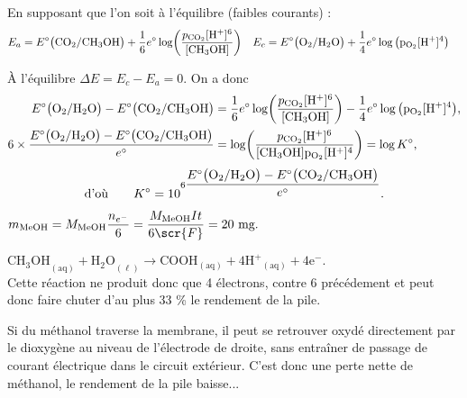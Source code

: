 \begin{solution}
\begin{questions}
\question En supposant que l'on soit à l'équilibre (faibles courants) :
\begin{align*}
    E_a &= E^\circ\qty\big(\mathrm{CO_2 / CH_3OH}) + \dfrac{1}{6}e^\circ \log(\dfrac{p_\mathrm{CO_2} \mathrm{[H^+]^6}}{\mathrm{[CH_3OH]}}) &
    E_c &= E^\circ\qty\big(\mathrm{O_2 / H_2O}) + \dfrac{1}{4}e^\circ \log\qty\big(\mathrm{p_\mathrm{O_2} [H^+]^4})
\end{align*}

\question \`A l'équilibre $\Delta E = E_c - E_a = 0$. On a donc
\begin{align*}
    E^\circ\qty\big(\mathrm{O_2 / H_2O}) - E^\circ\qty\big(\mathrm{CO_2 / CH_3OH})
    &= \dfrac{1}{6}e^\circ \log(\dfrac{p_\mathrm{CO_2} \mathrm{[H^+]^6}}{\mathrm{[CH_3OH]}}) - \dfrac{1}{4}e^\circ \log\qty\big(\mathrm{p_\mathrm{O_2} [H^+]^4}), \\
    6 \times \dfrac{E^\circ\qty\big(\mathrm{O_2 / H_2O}) - E^\circ\qty\big(\mathrm{CO_2 / CH_3OH})}{e^\circ} 
    &= \log(\dfrac{p_\mathrm{CO_2} \mathrm{[H^+]^6}}{\mathrm{[CH_3OH]p_\mathrm{O_2} [H^+]^4}}) = \log K^\circ,
\end{align*}
$$\text{d'o\`u} \qquad K^\circ = 10^{6 \dfrac{E^\circ\qty\big(\mathrm{O_2 / H_2O}) - E^\circ\qty\big(\mathrm{CO_2 / CH_3OH})}{e^\circ}}.$$

\question $m_\mathrm{MeOH} = M_\mathrm{MeOH} \dfrac{n_{e^-}}{6} = \dfrac{M_\mathrm{MeOH} I t}{6\scr{F}} = 20 \text{ mg}.$

\question $\mathrm{{CH_3OH}_{(aq)} + {H_2O}_{(\ell)} \longrightarrow {COOH}_{(aq)} + 4 {H^+}_{(aq)} + 4 e^-}.$ \\
Cette réaction ne produit donc que 4 électrons, contre 6 précédement et peut donc faire chuter d'au plus 33 \% le rendement de la pile.

\question Si du méthanol traverse la membrane, il peut se retrouver oxydé directement par le dioxygène au niveau de l’électrode de droite, sans entraîner de passage de courant électrique dans le circuit extérieur. C’est donc une perte nette de méthanol, le rendement de la pile baisse...

\end{questions}
\end{solution}